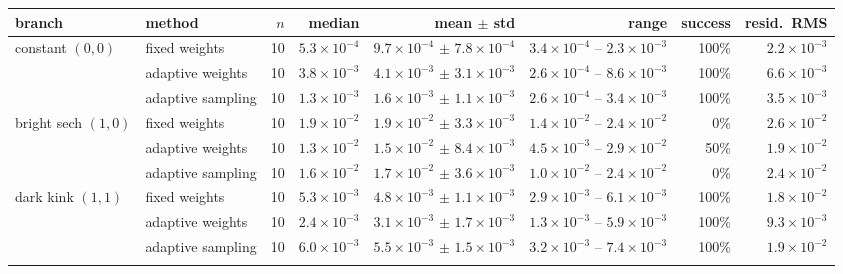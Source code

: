 \begin{tabular}{llrrrrrr}
\toprule
branch & method & $n$ & median & mean $\pm$ std & range & success & resid.\ RMS \\
\midrule
constant $(0,0)$ & fixed weights & 10 & $5.3\times10^{-4}$ & $9.7\times10^{-4}$ $\pm$ $7.8\times10^{-4}$ & $3.4\times10^{-4}$ -- $2.3\times10^{-3}$ & 100\% & $2.2\times10^{-3}$ \\
 & adaptive weights & 10 & $3.8\times10^{-3}$ & $4.1\times10^{-3}$ $\pm$ $3.1\times10^{-3}$ & $2.6\times10^{-4}$ -- $8.6\times10^{-3}$ & 100\% & $6.6\times10^{-3}$ \\
 & adaptive sampling & 10 & $1.3\times10^{-3}$ & $1.6\times10^{-3}$ $\pm$ $1.1\times10^{-3}$ & $2.6\times10^{-4}$ -- $3.4\times10^{-3}$ & 100\% & $3.5\times10^{-3}$ \\
\addlinespace
bright sech $(1,0)$ & fixed weights & 10 & $1.9\times10^{-2}$ & $1.9\times10^{-2}$ $\pm$ $3.3\times10^{-3}$ & $1.4\times10^{-2}$ -- $2.4\times10^{-2}$ & 0\% & $2.6\times10^{-2}$ \\
 & adaptive weights & 10 & $1.3\times10^{-2}$ & $1.5\times10^{-2}$ $\pm$ $8.4\times10^{-3}$ & $4.5\times10^{-3}$ -- $2.9\times10^{-2}$ & 50\% & $1.9\times10^{-2}$ \\
 & adaptive sampling & 10 & $1.6\times10^{-2}$ & $1.7\times10^{-2}$ $\pm$ $3.6\times10^{-3}$ & $1.0\times10^{-2}$ -- $2.4\times10^{-2}$ & 0\% & $2.4\times10^{-2}$ \\
\addlinespace
dark kink $(1,1)$ & fixed weights & 10 & $5.3\times10^{-3}$ & $4.8\times10^{-3}$ $\pm$ $1.1\times10^{-3}$ & $2.9\times10^{-3}$ -- $6.1\times10^{-3}$ & 100\% & $1.8\times10^{-2}$ \\
 & adaptive weights & 10 & $2.4\times10^{-3}$ & $3.1\times10^{-3}$ $\pm$ $1.7\times10^{-3}$ & $1.3\times10^{-3}$ -- $5.9\times10^{-3}$ & 100\% & $9.3\times10^{-3}$ \\
 & adaptive sampling & 10 & $6.0\times10^{-3}$ & $5.5\times10^{-3}$ $\pm$ $1.5\times10^{-3}$ & $3.2\times10^{-3}$ -- $7.4\times10^{-3}$ & 100\% & $1.9\times10^{-2}$ \\
\addlinespace
\bottomrule
\end{tabular}